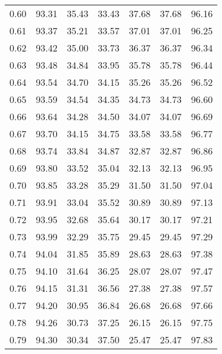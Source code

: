 \begin{tabular}{|c|c|c|c|c|c|c|}
      0.60 &     93.31 &     35.43 &      33.43 &   37.68 &      37.68 &         96.16 \\
      0.61 &     93.37 &     35.21 &      33.57 &   37.01 &      37.01 &         96.25 \\
      0.62 &     93.42 &     35.00 &      33.73 &   36.37 &      36.37 &         96.34 \\
      0.63 &     93.48 &     34.84 &      33.95 &   35.78 &      35.78 &         96.44 \\
      0.64 &     93.54 &     34.70 &      34.15 &   35.26 &      35.26 &         96.52 \\
      0.65 &     93.59 &     34.54 &      34.35 &   34.73 &      34.73 &         96.60 \\
      0.66 &     93.64 &     34.28 &      34.50 &   34.07 &      34.07 &         96.69 \\
      0.67 &     93.70 &     34.15 &      34.75 &   33.58 &      33.58 &         96.77 \\
      0.68 &     93.74 &     33.84 &      34.87 &   32.87 &      32.87 &         96.86 \\
      0.69 &     93.80 &     33.52 &      35.04 &   32.13 &      32.13 &         96.95 \\
      0.70 &     93.85 &     33.28 &      35.29 &   31.50 &      31.50 &         97.04 \\
      0.71 &     93.91 &     33.04 &      35.52 &   30.89 &      30.89 &         97.13 \\
      0.72 &     93.95 &     32.68 &      35.64 &   30.17 &      30.17 &         97.21 \\
      0.73 &     93.99 &     32.29 &      35.75 &   29.45 &      29.45 &         97.29 \\
      0.74 &     94.04 &     31.85 &      35.89 &   28.63 &      28.63 &         97.38 \\
      0.75 &     94.10 &     31.64 &      36.25 &   28.07 &      28.07 &         97.47 \\
      0.76 &     94.15 &     31.31 &      36.56 &   27.38 &      27.38 &         97.57 \\
      0.77 &     94.20 &     30.95 &      36.84 &   26.68 &      26.68 &         97.66 \\
      0.78 &     94.26 &     30.73 &      37.25 &   26.15 &      26.15 &         97.75 \\
      0.79 &     94.30 &     30.34 &      37.50 &   25.47 &      25.47 &         97.83 \\

\end{tabular}
